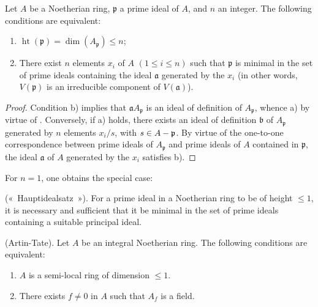 \begin{proposition}[16.3.1]
\label{0.16.3.1}
Let $A$ be a Noetherian ring, $\mathfrak{p}$ a prime ideal of $A$, and $n$ an integer.
The following conditions are equivalent:
\begin{enumerate}
  \item[\textup{a)}] $\operatorname{ht}(\mathfrak{p})=\dim(A_\mathfrak{p})\leq n$;
  \item[\textup{b)}] There exist $n$ elements $x_i$ of $A$ $(1\leq i\leq n)$ such that $\mathfrak{p}$ is minimal in the set of prime ideals containing the ideal $\mathfrak{a}$ generated by the $x_i$ \textup{(in other words,} $V(\mathfrak{p})$ is an irreducible component of $V(\mathfrak{a})$).
\end{enumerate}
\end{proposition}

\begin{proof}
Condition b) implies that $\mathfrak{a}A_\mathfrak{p}$ is an ideal of definition of $A_\mathfrak{p}$, whence a) by virtue of .
Conversely, if a) holds, there exists an ideal of definition $\mathfrak{b}$ of $A_\mathfrak{p}$ generated by $n$ elements $x_i/s$, with $s\in A-\mathfrak{p}$.
By virtue of the one-to-one correspondence between prime ideals of $A_\mathfrak{p}$ and prime ideals of $A$ contained in $\mathfrak{p}$, the ideal $\mathfrak{a}$ of $A$ generated by the $x_i$ satisfies b).
\end{proof}

For $n=1$, one obtains the special case:

\begin{corollary}[16.3.2]
\label{0.16.3.2}
\textup{(«~Hauptidealsatz~»).}
For a prime ideal in a Noetherian ring to be of height $\leq 1$, it is necessary and sufficient that it be minimal in the set of prime ideals containing a suitable principal ideal.
\end{corollary}

\begin{corollary}[16.3.3]
\label{0.16.3.3}
\textup{(Artin-Tate).}
Let $A$ be an integral Noetherian ring.
The following conditions are equivalent:
\begin{enumerate}
  \item[\textup{a)}] $A$ is a semi-local ring of dimension $\leq 1$.
  \item[\textup{b)}] There exists $f\neq 0$ in $A$ such that $A_f$ is a field.
\end{enumerate}
\end{corollary}

